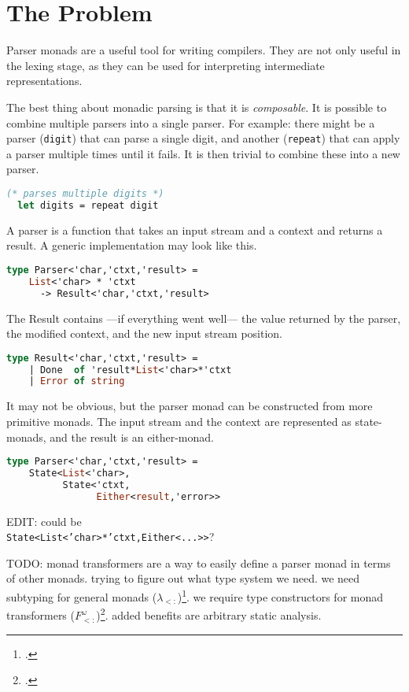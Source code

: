 \section{The Problem}
\begin{multicols}{2}
  Parser monads are a useful tool for writing compilers.
  They are not only useful in the lexing stage,
  as they can be used for interpreting intermediate representations.

  The best thing about monadic parsing is that it is \textit{composable}.
  It is possible to combine multiple parsers into a single parser.
  For example: there might be a parser (\texttt{digit}) that can parse a single digit,
  and another (\texttt{repeat}) that can apply a parser multiple times until it fails.
  It is then trivial to combine these into a new parser.
  \begin{lstlisting}[language=Caml]
  (* parses multiple digits *)
  let digits = repeat digit
  \end{lstlisting} 

  A parser is a function that takes an input stream and a context and returns a result.
  A generic implementation may look like this.
  \begin{lstlisting}[language=Caml]
  type Parser<'char,'ctxt,'result> =
    List<'char> * 'ctxt
      -> Result<'char,'ctxt,'result>
  \end{lstlisting}
  
  The Result contains ---if everything went well--- the value returned by the parser, the modified context, and the new input stream position.
  \begin{lstlisting}[language=Caml]
  type Result<'char,'ctxt,'result> = 
    | Done  of 'result*List<'char>*'ctxt
    | Error of string
  \end{lstlisting}

  It may not be obvious, but the parser monad can be constructed from more primitive monads.
  The input stream and the context are represented as state-monads, and the result is an either-monad.
  \begin{lstlisting}[language=Caml]
  type Parser<'char,'ctxt,'result> =
    State<List<'char>,
          State<'ctxt,
                Either<result,'error>>
  \end{lstlisting}
  EDIT: could be\\
  \texttt{State<List<'char>*'ctxt,Either<...>>}?

  
  
  TODO:
  monad transformers are a way to easily define a parser monad in terms of other monads.
  trying to figure out what type system we need.
  we need subtyping for general monads ($\lambda_{<:}$)\footcite[Chapter~15]{Pierce02}.
  we require type constructors for monad transformers ($F^\omega_{<:}$)\footcite[Chapter~31]{Pierce02}.
  added benefits are arbitrary static analysis.
\end{multicols}
